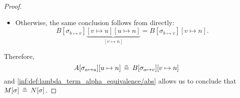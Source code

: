 \begin{proof}
\begin{itemize}
    \item Otherwise, the same conclusion follows from  directly:
    \begin{equation*}
      B[\sigma_{b \mapsto v}]\underbrace{[v \mapsto u][u \mapsto n]}_{[v \mapsto n]} = B[\sigma_{b \mapsto v}][v \mapsto n].
    \end{equation*}
  \end{itemize}

  Therefore,
  \begin{equation*}
    A[\sigma_{a \mapsto u}][u \mapsto n]
    \aequiv
    B[\sigma_{a \mapsto v}][v \mapsto n]
  \end{equation*}
  and \ref{inf:def:lambda_term_alpha_equivalence/abs} allows us to conclude that \( M[\sigma] \aequiv N[\sigma] \).
\end{proof}

